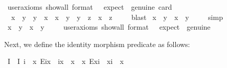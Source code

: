 \begin{isabellebody}
\ {\isacharbrackleft}user{\isacharunderscore}axioms{\isacharcomma}\ show{\isacharunderscore}all{\isacharcomma}\ format\ {\isacharequal}\ {}{\isacharcomma}\ expect\ {\isacharequal}\ genuine{\isacharcomma}\ card\ {\isacharequal}\ {}{\isacharbrackright}%
\isadelimproof
\ %
\endisadelimproof
%
\isatagproof
{}\isamarkupfalse%
%
\endisatagproof
{\isafoldproof}%
%
\isadelimproof
%
\endisadelimproof
\ \ \isanewline
{}\isamarkupfalse%
\ {\isachardoublequoteopen}\ {\isacharparenleft}x\ {\isasymsimeq}\ y\ \isactrlbold {\isasymrightarrow}\ y\ {\isasymsimeq}\ x{\isacharparenright}\ \isactrlbold {\isasymand}\ {\isacharparenleft}{\isacharparenleft}x\ {\isasymsimeq}\ y\ \isactrlbold {\isasymand}\ y\ {\isasymsimeq}\ z{\isacharparenright}\ \isactrlbold {\isasymrightarrow}\ x\ {\isasymsimeq}\ z{\isacharparenright}{\isachardoublequoteclose}\ \isanewline
%
\isadelimproof
\ \ %
\endisadelimproof
%
\isatagproof
{}\isamarkupfalse%
\ blast%
\endisatagproof
{\isafoldproof}%
%
\isadelimproof
\isanewline
%
\endisadelimproof
{}\isamarkupfalse%
\ {\isachardoublequoteopen}x\ {\isasymsimeq}\ y\ \isactrlbold {\isasymrightarrow}\ x\ {\isasymcong}\ y{\isachardoublequoteclose}\ \isanewline
%
\isadelimproof
\ \ %
\endisadelimproof
%
\isatagproof
{}\isamarkupfalse%
\ simp%
\endisatagproof
{\isafoldproof}%
%
\isadelimproof
\isanewline
%
\endisadelimproof
{}\isamarkupfalse%
\ {\isachardoublequoteopen}x\ {\isasymsimeq}\ y\ \isactrlbold {\isasymleftarrow}\ x\ {\isasymcong}\ y{\isachardoublequoteclose}\ %
\isanewline
\ \ \isamarkupfalse%
\ {\isacharbrackleft}user{\isacharunderscore}axioms{\isacharcomma}\ show{\isacharunderscore}all{\isacharcomma}\ format\ {\isacharequal}\ {}{\isacharcomma}\ expect\ {\isacharequal}\ genuine{\isacharbrackright}%
\isadelimproof
\ %
\endisadelimproof
%
\isatagproof
{}\isamarkupfalse%
%
\endisatagproof
{\isafoldproof}%
%
\isadelimproof
%
\endisadelimproof
%
\begin{isamarkuptext}%
Next, we define the identity morphism predicate  as follows:%
\end{isamarkuptext}\isamarkuptrue%
\isamarkupfalse%
\ I\ \ {\isachardoublequoteopen}I\ i\ {\isasymequiv}\ {\isacharparenleft}\isactrlbold {\isasymforall}x{\isachardot}\ E{\isacharparenleft}i{\isasymcdot}x{\isacharparenright}\ \isactrlbold {\isasymrightarrow}\ i{\isasymcdot}x\ {\isasymcong}\ x{\isacharparenright}\ \isactrlbold {\isasymand}\ {\isacharparenleft}\isactrlbold {\isasymforall}x{\isachardot}\ E{\isacharparenleft}x{\isasymcdot}i{\isacharparenright}\ \isactrlbold {\isasymrightarrow}\ x{\isasymcdot}i\ {\isasymcong}\ x{\isacharparenright}{\isachardoublequoteclose}%

\end{isabellebody}
